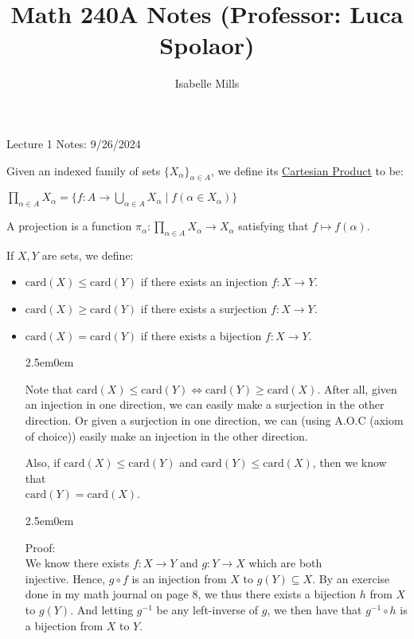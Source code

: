 \documentclass{book}
\title{Math 240A Notes (Professor: Luca Spolaor)}
\author{Isabelle Mills}
\newcommand{\learnToSpot}[1]{{\color{Red}#1}}
\newcommand{\hOne}{%
   \color{Black}%
   \fontsize{14}{16}\selectfont%
}
\newcommand{\hTwo}{%
\color{MidnightBlue}%
   \fontsize{13}{15}\selectfont%
}
\newcommand{\hThree}{%
   \color{PineGreen!85!Orange}
   \fontsize{12}{14}\selectfont%
}
\newenvironment{myIndent}{%
   \begin{adjustwidth}{2.5em}{0em}%
}{%
   \end{adjustwidth}%
}
\newcommand{\udefine}[1]{{%
   \setulcolor{Red}%
   \setul{0.14em}{0.07em}%
   \ul{#1}%
}}
\newcommand{\card}{\mathrm{card}}
\newcommand{\retTwo}{\hfill\bigbreak}
\newcommand{\mHeader}[1]{{
   \color{Black}%
   \fontsize{20}{18}\selectfont%
   #1\retTwo
}}
\begin{document}
\maketitle{}
\setul{0.14em}{0.07em}
\calibri

\hOne
\mHeader{Lecture 1 Notes: 9/26/2024}

Given an indexed family of sets $\{X_\alpha\}_{\alpha \in A}$, we define its \udefine{Cartesian Product} to be:

{\center $\prod\limits_{\alpha \in A}X_\alpha = \{f: A \longrightarrow \bigcup\limits_{\alpha \in A}X_\alpha \mid f(\alpha \in X_\alpha)\}$ \retTwo\par}

A projection is a function $\pi_\alpha : \prod\limits_{\alpha \in A}X_\alpha \longrightarrow X_\alpha$ satisfying that $f \mapsto f(\alpha)$.\retTwo

If $X, Y$ are sets, we define:
\begin{itemize}
	\item $\card(X) \leq \card(Y)$ if there exists an injection $f: X \longrightarrow Y$.
	\item  $\card(X) \geq \card(Y)$ if there exists a surjection $f: X \longrightarrow Y$.
	\item $\card(X) = \card(Y)$ if there exists a bijection $f: X \longrightarrow Y$.
	
	\begin{myIndent}\hTwo
		Note that $\card(X) \leq \card(Y) \Longleftrightarrow \card(Y) \geq \card(X)$. After all, given an injection in one direction, we can easily make a surjection in the other direction. Or given a surjection in one direction, we can \learnToSpot{(using A.O.C (axiom of choice))} easily make an injection in the other direction.\retTwo

		Also, if $\card(X) \leq \card(Y)$ and $\card(Y) \leq \card(X)$, then we know that\\ $\card(Y) = \card(X)$.
		
		\begin{myIndent}\hThree
			Proof:\\
			We know there exists $f: X \longrightarrow Y$ and $g: Y \longrightarrow X$ which are both\\ injective. Hence, $g \circ f$ is an injection from $X$ to $g(Y) \subseteq X$. By an exercise done in my math journal on page 8, we thus there exists a bijection $h$ from $X$ to $g(Y)$. And letting $g^{-1}$ be any left-inverse of $g$, we then have that $g^{-1} \circ h$ is a bijection from $X$ to $Y$.\retTwo
		\end{myIndent}
	\end{myIndent}
\end{itemize}
\end{document}
